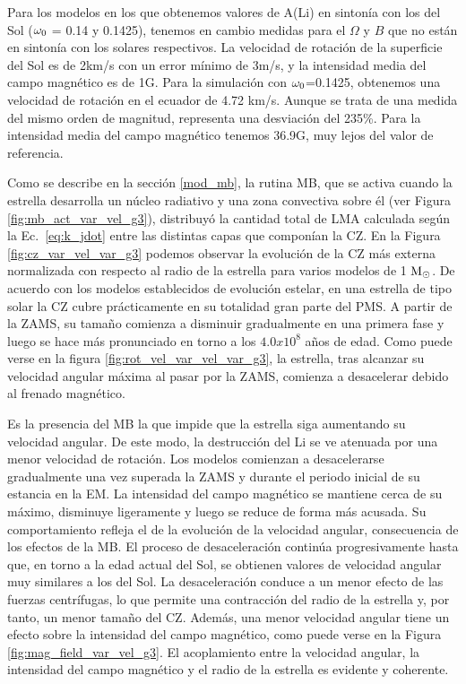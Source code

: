 Para los modelos en los que obtenemos valores de A(Li) en sintonía con los del Sol ($\omega_{\mathrm{0}}$ = 0.14 y 0.1425), tenemos en cambio medidas para el $\Omega$ y $B$ que no están en sintonía con los solares respectivos. La velocidad de rotación de la superficie del Sol es de 2km/s con un error mínimo de 3m/s, y la intensidad media del campo magnético es de 1G. Para la simulación con $\omega_{\mathrm{0}}$=0.1425, obtenemos una velocidad de rotación en el ecuador de 4.72 km/s. Aunque se trata de una medida del mismo orden de magnitud, representa una desviación del 235\%. Para la intensidad media del campo magnético tenemos 36.9G, muy lejos del valor de referencia.\par

Como se describe en la sección \ref{mod_mb}, la rutina MB, que se activa cuando la estrella desarrolla un núcleo radiativo y una zona convectiva sobre él (ver Figura \ref{fig:mb_act_var_vel_g3}), distribuyó la cantidad total de LMA calculada según la Ec.~\ref{eq:k_jdot} entre las distintas capas que componían la CZ. En la Figura \ref{fig:cz_var_vel_var_g3} podemos observar la evolución de la CZ más externa normalizada con respecto al radio de la estrella para varios modelos de 1 $\mathrm{M}_\odot$. De acuerdo con los modelos establecidos de evolución estelar, en una estrella de tipo solar la CZ cubre prácticamente en su totalidad gran parte del PMS. A partir de la ZAMS, su tamaño comienza a disminuir gradualmente en una primera fase y luego se hace más pronunciado en torno a los $4.0x10^8$ años de edad. Como puede verse en la figura \ref{fig:rot_vel_var_vel_var_g3}, la estrella, tras alcanzar su velocidad angular máxima al pasar por la ZAMS, comienza a desacelerar debido al frenado magnético.\par

Es la presencia del MB la que impide que la estrella siga aumentando su velocidad angular. De este modo, la destrucción del Li se ve atenuada por una menor velocidad de rotación. Los modelos comienzan a desacelerarse gradualmente una vez superada la ZAMS y durante el periodo inicial de su estancia en la EM. La intensidad del campo magnético se mantiene cerca de su máximo, disminuye ligeramente y luego se reduce de forma más acusada. Su comportamiento refleja el de la evolución de la velocidad angular, consecuencia de los efectos de la MB. El proceso de desaceleración continúa progresivamente hasta que, en torno a la edad actual del Sol, se obtienen valores de velocidad angular muy similares a los del Sol. La desaceleración conduce a un menor efecto de las fuerzas centrífugas, lo que permite una contracción del radio de la estrella y, por tanto, un menor tamaño del CZ. Además, una menor velocidad angular tiene un efecto sobre la intensidad del campo magnético, como puede verse en la Figura \ref{fig:mag_field_var_vel_g3}. El acoplamiento entre la velocidad angular, la intensidad del campo magnético y el radio de la estrella es evidente y coherente.\par

